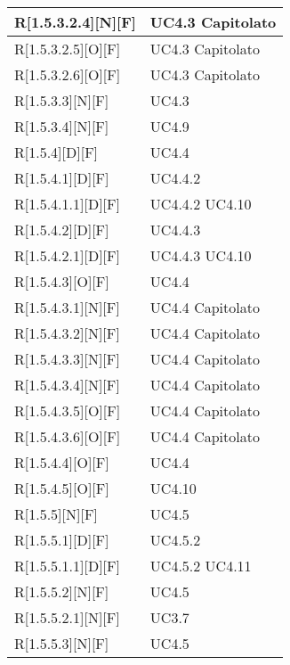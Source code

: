 \begin{longtable}{X | X}
\hline
R[1.5.3.2.4][N][F] & UC4.3 \newline Capitolato \\
\hline
R[1.5.3.2.5][O][F] & UC4.3 \newline Capitolato \\
\hline
R[1.5.3.2.6][O][F] & UC4.3 \newline Capitolato \\
\hline
R[1.5.3.3][N][F] & UC4.3 \\
\hline
R[1.5.3.4][N][F] & UC4.9 \\
\hline
R[1.5.4][D][F] & UC4.4 \\
\hline
R[1.5.4.1][D][F] & UC4.4.2 \\
\hline
R[1.5.4.1.1][D][F] & UC4.4.2 \newline UC4.10 \\
\hline
R[1.5.4.2][D][F] & UC4.4.3 \\
\hline
R[1.5.4.2.1][D][F] & UC4.4.3 \newline UC4.10 \\
\hline
R[1.5.4.3][O][F] & UC4.4 \\
\hline
R[1.5.4.3.1][N][F] & UC4.4 \newline Capitolato \\
\hline
R[1.5.4.3.2][N][F] & UC4.4 \newline Capitolato \\
\hline
R[1.5.4.3.3][N][F] & UC4.4 \newline Capitolato \\
\hline
R[1.5.4.3.4][N][F] & UC4.4 \newline Capitolato \\
\hline
R[1.5.4.3.5][O][F] & UC4.4 \newline Capitolato \\
\hline
R[1.5.4.3.6][O][F] & UC4.4 \newline Capitolato \\
\hline
R[1.5.4.4][O][F] & UC4.4 \\
\hline
R[1.5.4.5][O][F] & UC4.10 \\
\hline
R[1.5.5][N][F] & UC4.5 \\
\hline
R[1.5.5.1][D][F] & UC4.5.2 \\
\hline
R[1.5.5.1.1][D][F] & UC4.5.2 \newline UC4.11 \\
\hline
R[1.5.5.2][N][F] & UC4.5 \\
\hline
R[1.5.5.2.1][N][F] & UC3.7 \\
\hline
R[1.5.5.3][N][F] & UC4.5 \\

\end{longtable}
